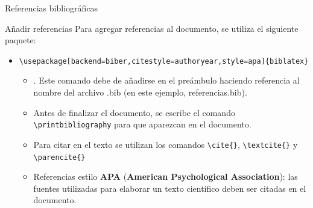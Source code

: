 \documentclass[aspectratio=169, 10pt]{beamer}
\begin{document}
\begin{frame}[fragile]{Referencias bibliográficas} \pause

    \begin{alertblock}{Añadir referencias}
                Para agregar referencias al documento, se utiliza el siguiente paquete:
    \begin{itemize}
        \item \verb|\usepackage[backend=biber,citestyle=authoryear,style=apa]{biblatex}| \pause
        \begin{itemize}
            \item \verb||. Este comando debe de añadirse en el preámbulo haciendo referencia al nombre del archivo .bib (en este ejemplo, referencias.bib). \pause
            \item Antes de finalizar el documento, se escribe el comando \verb|\printbibliography| para que aparezcan en el documento.  \pause
            \item Para citar en el texto se utilizan los comandos \verb|\cite{}|, \verb|\textcite{}| y \verb|\parencite{}| \pause
            \item Referencias estilo \textbf{APA} (\textbf{American Psychological Association}): las fuentes utilizadas para elaborar un texto científico deben ser citadas en el documento.
        \end{itemize}
    \end{itemize}

        
        
    \end{alertblock}
    
\end{frame}
\end{document}
